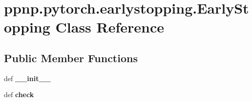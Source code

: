 \hypertarget{classppnp_1_1pytorch_1_1earlystopping_1_1EarlyStopping}{}\section{ppnp.\+pytorch.\+earlystopping.\+Early\+Stopping Class Reference}
\label{classppnp_1_1pytorch_1_1earlystopping_1_1EarlyStopping}
\subsection*{Public Member Functions}
\begin{DoxyCompactItemize}
\item 
\mbox{\label{classppnp_1_1pytorch_1_1earlystopping_1_1EarlyStopping_afe4dfc5feb184b42f82df8b89a9b2d8d}} 
def {\bfseries \+\_\+\+\_\+init\+\_\+\+\_\+}
\item 
\mbox{\label{classppnp_1_1pytorch_1_1earlystopping_1_1EarlyStopping_a239bb97ab9ffc6d579b74b05d7665696}} 
def {\bfseries check}
\end{DoxyCompactItemize}
